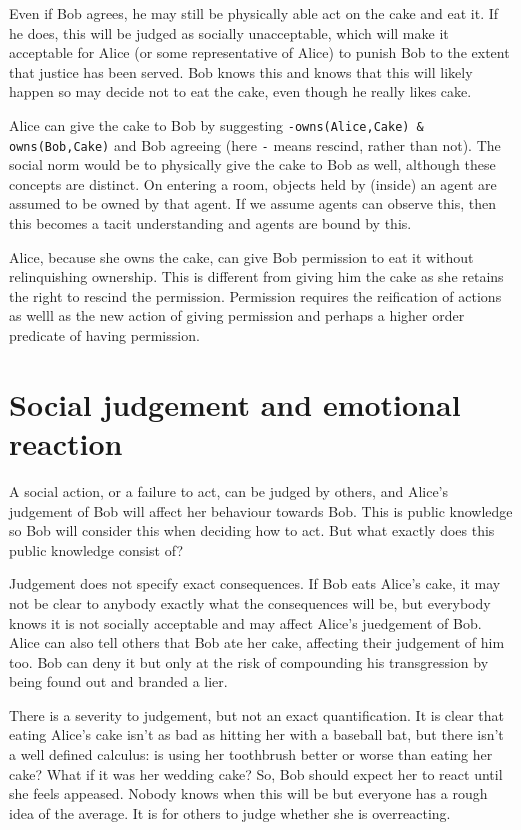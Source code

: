 \documentclass[a4paper]{article}
\begin{document}
Even if Bob agrees, he may still be physically able act on the cake and eat it. If he does, this will be judged as socially unacceptable, which will make it acceptable for Alice (or some representative of Alice) to punish Bob to the extent that justice has been served. Bob knows this and knows that this will likely happen so may decide not to eat the cake, even though he really likes cake.

Alice can give the cake to Bob by suggesting \texttt{-owns(Alice,Cake) \& owns(Bob,Cake)} and Bob agreeing (here \texttt{-} means rescind, rather than not). The social norm would be to physically give the cake to Bob as well, although these concepts are distinct. On entering a room, objects held by (inside) an agent are assumed to be owned by that agent. If we assume agents can observe this, then this becomes a tacit understanding and agents are bound by this. 

Alice, because she owns the cake, can give Bob permission to eat it without relinquishing ownership. This is different from giving him the cake as she retains the right to rescind the permission. Permission requires the reification of actions as welll as the new action of giving permission and perhaps a higher order predicate of having permission.

\section{Social judgement and emotional reaction}

A social action, or a failure to act, can be judged by others, and Alice's judgement of Bob will affect her behaviour towards Bob. This is public knowledge so Bob will consider this when deciding how to act. But what exactly does this public knowledge consist of?

Judgement does not specify exact consequences. If Bob eats Alice's cake, it may not be clear to anybody exactly what the consequences will be, but everybody knows it is not socially acceptable and may affect Alice's juedgement of Bob. Alice can also tell others that Bob ate her cake, affecting their judgement of him too. Bob can deny it but only at the risk of compounding his transgression by being found out and branded a lier.

There is a severity to judgement, but not an exact quantification. It is clear that eating Alice's cake isn't as bad as hitting her with a baseball bat, but there isn't a well defined calculus: is using her toothbrush better or worse than eating her cake? What if it was her wedding cake? So, Bob should expect her to react until she feels appeased. Nobody knows when this will be but everyone has a rough idea of the average. It is for others to judge whether she is overreacting.
\end{document}

